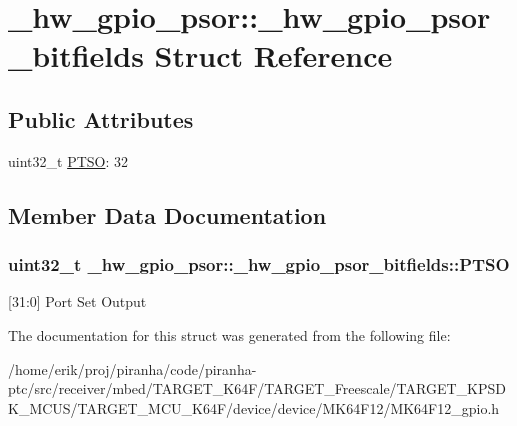 \hypertarget{struct__hw__gpio__psor_1_1__hw__gpio__psor__bitfields}{}\section{\+\_\+hw\+\_\+gpio\+\_\+psor\+:\+:\+\_\+hw\+\_\+gpio\+\_\+psor\+\_\+bitfields Struct Reference}
\label{struct__hw__gpio__psor_1_1__hw__gpio__psor__bitfields}
\subsection*{Public Attributes}
\begin{DoxyCompactItemize}
\item 
uint32\+\_\+t \hyperlink{struct__hw__gpio__psor_1_1__hw__gpio__psor__bitfields_a87aba8ee6cb88490bbfb4539678fe6f7}{P\+T\+SO}\+: 32
\end{DoxyCompactItemize}


\subsection{Member Data Documentation}
\subsubsection[{\texorpdfstring{P\+T\+SO}{PTSO}}]{\setlength{\rightskip}{0pt plus 5cm}uint32\+\_\+t \+\_\+hw\+\_\+gpio\+\_\+psor\+::\+\_\+hw\+\_\+gpio\+\_\+psor\+\_\+bitfields\+::\+P\+T\+SO}\hypertarget{struct__hw__gpio__psor_1_1__hw__gpio__psor__bitfields_a87aba8ee6cb88490bbfb4539678fe6f7}{}\label{struct__hw__gpio__psor_1_1__hw__gpio__psor__bitfields_a87aba8ee6cb88490bbfb4539678fe6f7}
\mbox{[}31\+:0\mbox{]} Port Set Output 

The documentation for this struct was generated from the following file\+:\begin{DoxyCompactItemize}
\item 
/home/erik/proj/piranha/code/piranha-\/ptc/src/receiver/mbed/\+T\+A\+R\+G\+E\+T\+\_\+\+K64\+F/\+T\+A\+R\+G\+E\+T\+\_\+\+Freescale/\+T\+A\+R\+G\+E\+T\+\_\+\+K\+P\+S\+D\+K\+\_\+\+M\+C\+U\+S/\+T\+A\+R\+G\+E\+T\+\_\+\+M\+C\+U\+\_\+\+K64\+F/device/device/\+M\+K64\+F12/M\+K64\+F12\+\_\+gpio.\+h\end{DoxyCompactItemize}
